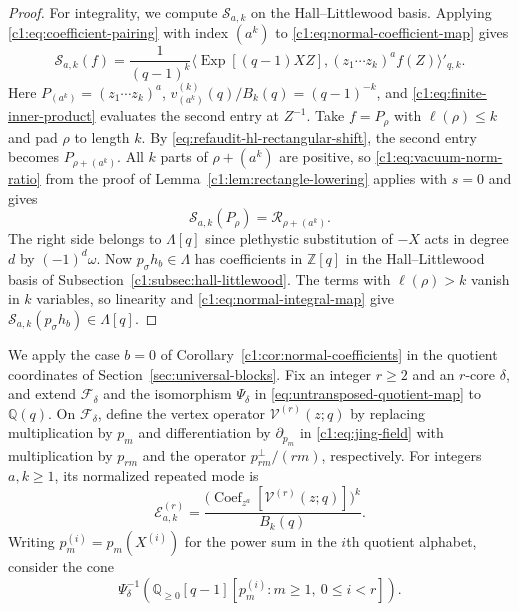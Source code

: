 \documentclass[12pt,reqno,a4paper]{amsart}
\numberwithin{equation}{section}
\numberwithin{figure}{section}
\theoremstyle{plain}
\theoremstyle{definition}
\DeclareMathOperator{\Coef}{Coef}
\begin{document}
\begin{proof}
For integrality, we compute $\mathcal S_{a,k}$ on the Hall--Littlewood
basis.  Applying \eqref{c1:eq:coefficient-pairing} with index $(a^k)$
to \eqref{c1:eq:normal-coefficient-map} gives
\begin{equation}\label{eq:refaudit-normal-map-inner-product}
 \mathcal S_{a,k}(f)=\frac1{(q-1)^k}
   \bigl\langle\operatorname{Exp}[(q-1)XZ],
                   (z_1\cdots z_k)^a f(Z)\bigr\rangle'_{q,k}.
\end{equation}
Here $P_{(a^k)}=(z_1\cdots z_k)^a$,
$v_{(a^k)}^{(k)}(q)/B_k(q)=(q-1)^{-k}$, and
\eqref{c1:eq:finite-inner-product} evaluates the second entry at $Z^{-1}$.
Take $f=P_\rho$ with $\ell(\rho)\leq k$ and pad $\rho$ to length $k$.
By \eqref{eq:refaudit-hl-rectangular-shift}, the second entry becomes
$P_{\rho+(a^k)}$.  All $k$ parts of $\rho+(a^k)$ are positive, so
\eqref{c1:eq:vacuum-norm-ratio} from the proof of
Lemma~\ref{c1:lem:rectangle-lowering} applies with $s=0$ and gives
\begin{equation}\label{c1:eq:normal-integral-map}
 \mathcal S_{a,k}(P_\rho)=\mathcal R_{\rho+(a^k)}.
\end{equation}
The right side belongs to $\Lambda[q]$ since plethystic substitution
of $-X$ acts in degree $d$ by $(-1)^d\omega$.
Now $p_\sigma h_b\in\Lambda$ has coefficients in $\mathbb Z[q]$ in
the Hall--Littlewood basis of Subsection~\ref{c1:subsec:hall-littlewood}.
The terms with $\ell(\rho)>k$ vanish in $k$ variables, so linearity
and \eqref{c1:eq:normal-integral-map} give
$\mathcal S_{a,k}(p_\sigma h_b)\in\Lambda[q]$.
\end{proof}

We apply the case $b=0$ of Corollary~\ref{c1:cor:normal-coefficients}
in the quotient coordinates of Section~\ref{sec:universal-blocks}.
Fix an integer
$r\geq2$ and an $r$-core $\delta$, and extend
$\mathcal F_\delta$ and the isomorphism $\Psi_\delta$ in
\eqref{eq:untransposed-quotient-map} to $\mathbb Q(q)$.
On $\mathcal F_\delta$, define the vertex operator $\mathscr V^{(r)}(z;q)$ by
replacing multiplication by $p_m$ and differentiation by
$\partial_{p_m}$ in \eqref{c1:eq:jing-field} with multiplication
by $p_{rm}$ and the operator $p_{rm}^{\perp}/(rm)$, respectively.
For integers $a,k\geq1$, its normalized repeated mode is
\[
 \mathscr E^{(r)}_{a,k}
 =\frac{\bigl(\Coef_{z^a}[\mathscr V^{(r)}(z;q)]\bigr)^k}{B_k(q)}.
\]
Writing $p_m^{(i)}=p_m(X^{(i)})$ for the power sum in the $i$th
quotient alphabet, consider the cone
\begin{equation}\label{bridge:eq:core-cone}
 \Psi_\delta^{-1}\!\left(
   \mathbb Q_{\geq0}[q-1][p_m^{(i)}:m\geq1,\ 0\leq i<r]\right).
\end{equation}
\end{document}
